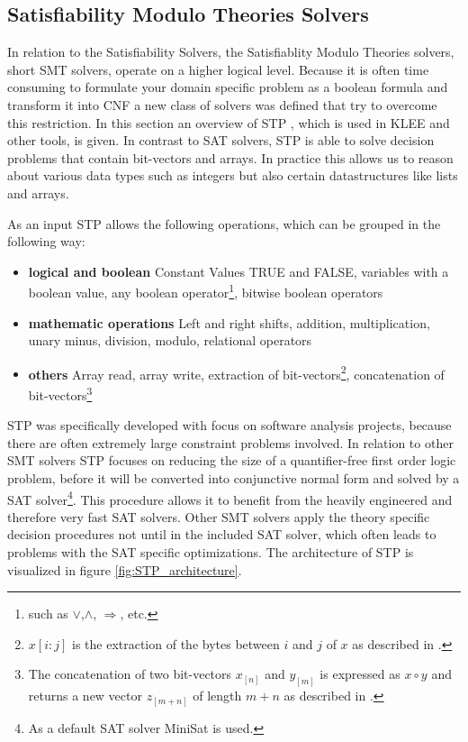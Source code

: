 \subsection{Satisfiability Modulo Theories Solvers}
In relation to the Satisfiability Solvers, the Satisfiablity Modulo Theories solvers, short SMT solvers, operate on a higher logical level. Because it is often time consuming to formulate your domain specific problem as a boolean formula and transform it into CNF a new class of solvers was defined that try to overcome this restriction. In this section an overview of STP \cite{Ganesh:2007:DPB:1770351.1770421}, which is used in KLEE and other tools, is given.
In contrast to SAT solvers, STP is able to solve decision problems that contain bit-vectors and arrays. In practice this allows us to reason about various data types such as integers but also certain datastructures like lists and arrays.

As an input STP allows the following operations, which can be grouped in the following way:
\begin{itemize}
\item \textbf{logical and boolean} Constant Values TRUE and FALSE, variables with a boolean value, any boolean operator\footnote{such as $\lor$,$\land$, $\Rightarrow$, etc.}, bitwise boolean operators
\item \textbf{mathematic operations} Left and right shifts, addition, multiplication, unary minus, division, modulo, relational operators
\item \textbf{others} Array read, array write,  extraction of bit-vectors\footnote{$x[i:j]$ is the extraction of the bytes between $i$ and $j$ of $x$ as described in \cite{Ganesh:2007:DPB:1770351.1770421}.}, concatenation of bit-vectors\footnote{The concatenation of two bit-vectors $x_{[n]}$ and $y_{[m]}$ is expressed as $x \circ y$ and returns a new vector $z_{[m+n]}$ of length $m+n$ as described in \cite{Ganesh:2007:DPB:1770351.1770421}.}
\end{itemize}
STP was specifically developed with focus on software analysis projects, because there are often extremely large constraint problems involved. In relation to other SMT solvers STP focuses on reducing the size of a quantifier-free first order logic problem, before it will be converted into conjunctive normal form and solved by a SAT solver\footnote{As a default SAT solver MiniSat\cite{10.1007/978-3-540-24605-3_37} is used.}. This procedure allows it to benefit from the heavily engineered and therefore very fast SAT solvers. Other SMT solvers apply the theory specific decision procedures not until in the included SAT solver, which often leads to problems with the SAT specific optimizations. The architecture of STP is visualized in figure \ref{fig:STP_architecture}.

